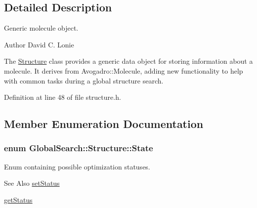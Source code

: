 \subsection{Detailed Description}
Generic molecule object. 

\begin{DoxyAuthor}{Author}
David C. Lonie
\end{DoxyAuthor}
The \hyperlink{classGlobalSearch_1_1Structure}{Structure} class provides a generic data object for storing information about a molecule. It derives from Avogadro\-::\-Molecule, adding new functionality to help with common tasks during a global structure search. 

Definition at line 48 of file structure.\-h.



\subsection{Member Enumeration Documentation}
\hypertarget{classGlobalSearch_1_1Structure_a3f1e44cb4f603fe1b3fbc8e813535917}{
\subsubsection[{State}]{\setlength{\rightskip}{0pt plus 5cm}enum {\bf Global\-Search\-::\-Structure\-::\-State}}}\label{classGlobalSearch_1_1Structure_a3f1e44cb4f603fe1b3fbc8e813535917}
Enum containing possible optimization statuses. \begin{DoxySeeAlso}{See Also}
\hyperlink{classGlobalSearch_1_1Structure_aee38b5fe04ee88a4584b181fa8d0fbf9}{set\-Status} 

\hyperlink{classGlobalSearch_1_1Structure_ad67c972a173cddc939e3adabf65dd72b}{get\-Status} 
\end{DoxySeeAlso}
